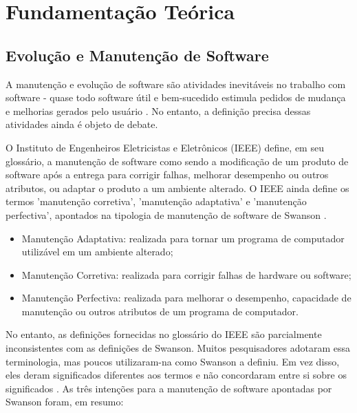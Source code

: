 \chapter[Fundamentação Teórica]{Fundamentação Teórica}

\section{Evolução e Manutenção de Software}



A manutenção e evolução de software são atividades inevitáveis no trabalho com software - 
quase todo software útil e bem-sucedido estimula pedidos de mudança e melhorias gerados pelo usuário \cite{bennett2000software}. 
No entanto, a definição precisa dessas atividades ainda é objeto de debate.

O Instituto de Engenheiros Eletricistas e Eletrônicos (IEEE) define, em seu glossário, 
a manutenção de software como sendo a modificação de um produto de software após a entrega para 
corrigir falhas, melhorar desempenho ou outros atributos, ou adaptar o produto a um ambiente alterado. 
O IEEE ainda define os termos 'manutenção corretiva', 'manutenção adaptativa' e 'manutenção perfectiva', 
apontados na tipologia de manutenção de software de Swanson \cite{1990IEEESGo, swanson1976dimensions}.

\begin{itemize}
    \item Manutenção Adaptativa: realizada para tornar um programa de computador utilizável em um ambiente alterado;
    \item Manutenção Corretiva: realizada para corrigir falhas de hardware ou software;
    \item Manutenção Perfectiva: realizada para melhorar o desempenho, capacidade de manutenção ou outros atributos de um programa de computador.
\end{itemize}

No entanto, as definições fornecidas no glossário do IEEE são parcialmente inconsistentes com as 
definições de Swanson. Muitos pesquisadores adotaram essa terminologia, mas poucos utilizaram-na 
como Swanson a definiu. Em vez disso, eles deram significados diferentes aos termos e não concordaram 
entre si sobre os significados \cite{chapin2001types}. As três intenções para a manutenção de software 
apontadas por Swanson foram, em resumo:

